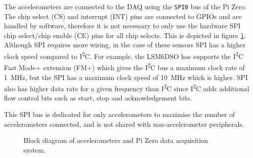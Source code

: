 \documentclass[a4paper,11pt]{article}
\newcommand{\textoverline}[1]{$\overline{\mbox{#1}}$}
\newcommand{\iic}{{I\textsuperscript{2}C}}
\begin{document}
The accelerometers are connected to the DAQ using the \texttt{SPI0} bus of the Pi Zero. The chip select (\textoverline{CS}) and interrupt (INT) pins are connected to GPIOs and are handled by software, therefore it is not necessary to only use the hardware SPI chip select/chip enable (CE) pins for all chip selects. This is depicted in figure \ref{fig:accelerometers-sch-block}. Although SPI requires more wiring, in the case of these sensors SPI has a higher clock speed compared to {\iic}. For example, the LSM6DSO has supports the {\iic} Fast Mode+ extension (FM+) which gives the {\iic} bus a maximum clock rate of \SI{1}{\mega\hertz}, but the SPI has a maximum clock speed of \SI{10}{\mega\hertz} which is higher. SPI also has higher data rate for a given frequency than {\iic} since {\iic} adds additional flow control bits such as start, stop and acknowledgement bits.

This SPI bus is dedicated for only accelerometers to maximise the number of accelerometers connected, and is not shared with non-accelerometer peripherals.

\begin{figure}[H]
  \centering
  
  \caption{Block diagram of accelerometers and Pi Zero data acquisition system.}
  \label{fig:accelerometers-sch-block}
\end{figure}
\end{document}
